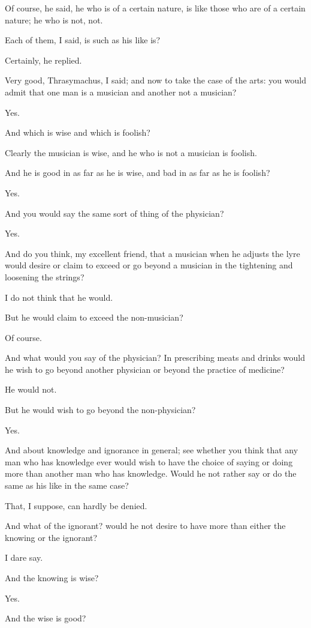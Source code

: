 Of course, he said, he who is of a certain nature, is like those who are
of a certain nature; he who is not, not.

Each of them, I said, is such as his like is?

Certainly, he replied.

Very good, Thrasymachus, I said; and now to take the case of the arts:
you would admit that one man is a musician and another not a musician?

Yes.

And which is wise and which is foolish?

Clearly the musician is wise, and he who is not a musician is foolish.

And he is good in as far as he is wise, and bad in as far as he is
foolish?

Yes.

And you would say the same sort of thing of the physician?

Yes.

And do you think, my excellent friend, that a musician when he adjusts
the lyre would desire or claim to exceed or go beyond a musician in the
tightening and loosening the strings?

I do not think that he would.

But he would claim to exceed the non-musician?

Of course.

And what would you say of the physician? In prescribing meats and drinks
would he wish to go beyond another physician or beyond the practice of
medicine?

He would not.

But he would wish to go beyond the non-physician?

Yes.

And about knowledge and ignorance in general; see whether you think that
any man who has knowledge ever would wish to have the choice of saying
or doing more than another man who has knowledge. Would he not rather
say or do the same as his like in the same case?

That, I suppose, can hardly be denied.

And what of the ignorant? would he not desire to have more than either
the knowing or the ignorant?

I dare say.

And the knowing is wise?

Yes.

And the wise is good?

